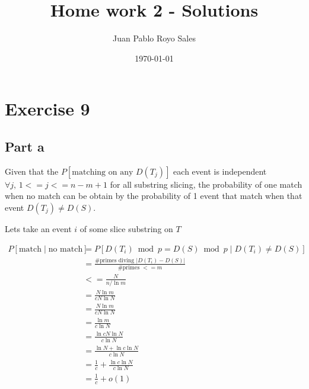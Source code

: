 \documentclass[12pt, a4paper]{article}
\title{Home work 2 - Solutions}
\author{Juan Pablo Royo Sales}
\date\today
\begin{document}
\begin{titlingpage}
  \maketitle
\end{titlingpage}

\section{Exercise 9}
\subsection{Part a}

Given that the $P[\text{matching on any } D(T_j)]$ each event is independent
$\forall j,\, 1 <= j <= n - m + 1$ for all substring slicing, the probability of
one match when no match can be obtain by the probability of 1 event that match
when that event $D(T_j) \neq D(S)$.

Lets take an event $i$ of some slice substring on $T$

\begin{subequations}
  \begin{align}
    P[\text{match} \mid \text{no match}] &= P\left[D(T_i) \bmod p = D(S) \bmod p \mid D(T_i) \neq D(S)\right] \\
                                         &= \frac{\text{\# primes diving } | D(T_i) - D(S) | }{\text{\# primes }<= m} \\
                                         &<= \frac{N}{n/\ln{m}} \\
                                         &= \frac{N\ln{m}}{cN\ln{N}} \\
                                         &= \frac{N\ln{m}}{cN\ln{N}} \\
                                         &= \frac{\ln{m}}{c\ln{N}} \\
                                         &= \frac{\ln{cN\ln{N}}}{c\ln{N}} \\
                                         &= \frac{\ln{N}+\ln{c\ln{N}}}{c\ln{N}} \\
                                         &= \frac{1}{c} + \frac{\ln{c\ln{N}}}{c\ln{N}} \\
                                         &= \frac{1}{c} + o(1) 
  \end{align}
\end{subequations}
\end{document}
